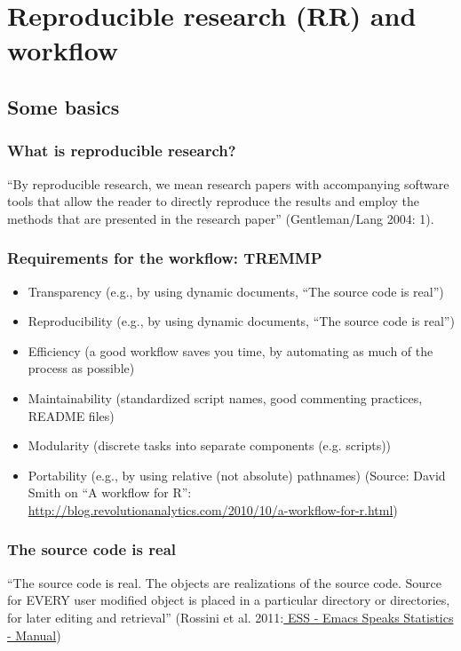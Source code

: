 \documentclass[bigger]{beamer}
\begin{document}
\section{Reproducible research (RR) and workflow}
\label{sec-6}
\subsection{Some basics}
\label{sec-6-1}
\begin{frame}
\frametitle{What is reproducible research?}
\label{sec-6-1-1}


    \enquote{By reproducible research, we mean research papers with accompanying software tools that allow the
    reader to directly reproduce the results and employ the methods that are presented in the research
    paper} (Gentleman/Lang 2004: 1). 
\end{frame}
\begin{frame}
\frametitle{Requirements for the workflow: TREMMP}
\label{sec-6-1-2}

    \small
\begin{itemize}
\item Transparency (e.g., by using dynamic documents, \enquote{The source code is real})
\item Reproducibility (e.g., by using dynamic documents, \enquote{The source code is real})
\item Efficiency (a good workflow saves you time, by automating as much of the process as possible)
\item Maintainability (standardized script names, good commenting practices, README files)
\item Modularity (discrete tasks into separate components (e.g. scripts))
\item Portability (e.g., by using relative (not absolute) pathnames)
      \vfill
      \tiny
      (Source: David Smith on \enquote{A workflow for R}: \href{http://blog.revolutionanalytics.com/2010/10/a-workflow-for-r.html}{http://blog.revolutionanalytics.com/2010/10/a-workflow-for-r.html})
\end{itemize}
\end{frame}
\begin{frame}
\frametitle{The source code is real}
\label{sec-6-1-3}

    \enquote{The source code is real. The objects are realizations of the source code. Source for EVERY user
    modified object is placed in a particular directory or directories, for later editing and retrieval}
    (Rossini et al. 2011:\href{http://ess.r-project.org/Manual/ess.html}{ ESS - Emacs Speaks Statistics - Manual})
\end{frame}
\end{document}
